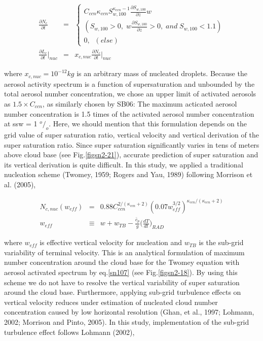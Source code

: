 \begin{eqnarray}
\frac{\partial N_{c}}{\partial t}&=&
\left\{
\begin{array}{l}
C_{ccn}\kappa_{ccn}S_{w,100}^{\kappa_{ccn}-1}\frac{\partial S_{w,100}}{\partial z}w\nonumber\\
(S_{w,100}>0,\;w\frac{\partial S_{w,100}}{\partial z}>0,\;and\;S_{w,100}<1.1) \nonumber\\
0,\;\;(else)
\end{array}
\right.\\
\label{sn108}
\frac{\partial L_{c}}{\partial t}\Bigr|_{nuc}&=&x_{c,nuc}\frac{\partial N_{c}}{\partial t}\Bigr|_{nuc}\label{sn109}
\end{eqnarray}

where $x_{c,nuc} = 10^{-12} kg$ is an arbitrary mass of nucleated droplets. Because the aerosol activity spectrum is a function of supersaturation and unbounded by the total aerosol number concentration, we chose an upper limit of activated aerosols as $1.5 \times C_{ccn}$, as similarly chosen by SB06: The maximum acticated aerosol number concentration is 1.5 times of the activated aerosol number concentration at ssw = 1 $^{o}/_{o}$. Here, we should mention that this formulation depends on the grid value of super saturation ratio, vertical velocity and vertical derivation of the super saturation ratio. Since super saturation significantly varies in tens of meters above cloud base (see Fig.\ref{figsn2-21}), accurate prediction of super saturation and its vertical derivation is quite difficult. In this study, we applied a traditional nucleation scheme (Twomey, 1959; Rogers and Yau, 1989) following Morrison et al. (2005),

\begin{eqnarray}
N_{c,nuc}(w_{eff})&=&0.88C_{ccn}^{2/(\kappa_{ccn}+2)}(0.07w_{eff}^{3/2})^{\kappa_{ccn}/(\kappa_{ccn}+2)}\label{sn110}\\
w_{eff}&\equiv&w+w_{TB}-\frac{\bar{c}_{p}}{g}\bigl(\frac{dT}{dt}\bigr)_{RAD}\label{sn111}
\end{eqnarray}

where $w_{eff}$ is effective vertical velocity for nucleation and $w_{TB}$ is the sub-grid variability of terminal velocity. This is an analytical formulation of maximum number concentration around the cloud base for the Twomey equation with aerosol activated spectrum by eq.\ref{sn107} (see Fig.\ref{figsn2-18}). By using this scheme we do not have to resolve the vertical variability of super saturation around the cloud base. Furthermore, applying sub-grid turbulence effects on vertical velocity reduces under estimation of nucleated cloud number concentration caused by low horizontal resolution (Ghan, et al., 1997; Lohmann, 2002; Morrison and Pinto, 2005). In this study, implementation of the sub-grid turbulence effect follows Lohmann (2002),

